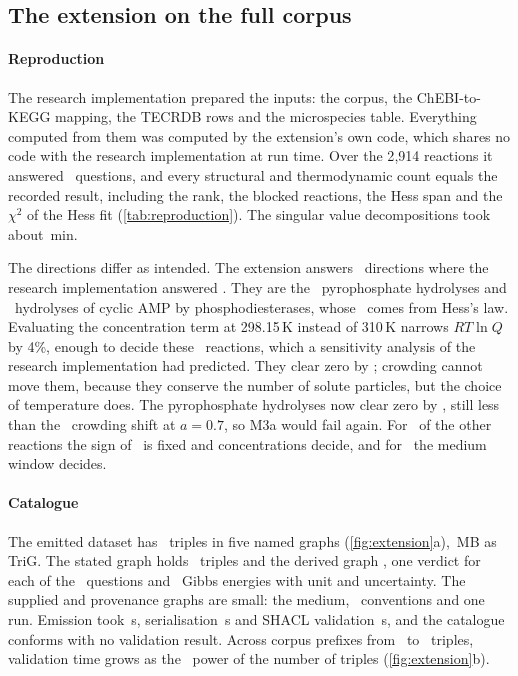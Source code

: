 \subsection{The extension on the full corpus}
\label{sec:res-extension}



\paragraph{Reproduction}
The research implementation prepared the inputs: the corpus, the ChEBI-to-KEGG mapping, the TECRDB rows and the microspecies table.
Everything computed from them was computed by the extension's own code, which shares no code with the research implementation at run time.
Over the 2{,}914 reactions it answered \xVerdicts\ questions, and every structural and thermodynamic count equals the recorded result, including the rank, the blocked reactions, the Hess span and the $\chi^2$ of the Hess fit (\cref{tab:reproduction}).
The singular value decompositions took about \xStructureMin\,min.

The directions differ as intended.
The extension answers \xDirAnswered\ directions where the research implementation answered \xDirKernel.
They are the \xDirAnsweredMeasured\ pyrophosphate hydrolyses and \xDirAnsweredHess\ hydrolyses of cyclic AMP by phosphodiesterases, whose \DG\ comes from Hess's law.
Evaluating the concentration term at 298.15\,K instead of 310\,K narrows $RT\ln Q$ by 4\%, enough to decide these \xDirAnsweredHess\ reactions, which a sensitivity analysis of the research implementation had predicted.
They clear zero by \xMarginHess\kJ; crowding cannot move them, because they conserve the number of solute particles, but the choice of temperature does.
The pyrophosphate hydrolyses now clear zero by \xMarginMeasured\kJ, still less than the \xCrowding\kJ\ crowding shift at $a=0.7$, so M3a would fail again.
For \xDirConc\ of the other reactions the sign of \DGm\ is fixed and concentrations decide, and for \xDirMedium\ the medium window decides.

\paragraph{Catalogue}
The emitted dataset has \xTriples\ triples in five named graphs (\cref{fig:extension}a), \xTrigMB\,MB as TriG.
The stated graph holds \xStated\ triples and the derived graph \xDerived, one verdict for each of the \xVerdicts\ questions and \xGibbs\ Gibbs energies with unit and uncertainty.
The supplied and provenance graphs are small: the medium, \xConventions\ conventions and one run.
Emission took \xEmit\,s, serialisation \xSerialise\,s and SHACL validation \xValidate\,s, and the catalogue conforms with no validation result.
Across corpus prefixes from \xScalingMin\ to \xTriples\ triples, validation time grows as the \xScalingSlope\ power of the number of triples (\cref{fig:extension}b).

